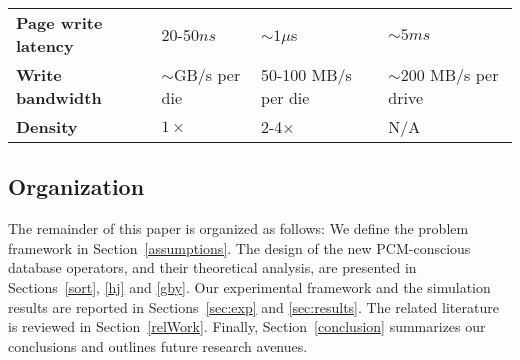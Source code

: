 \begin{table}[!h]
\begin{small}
\begin{tabular}{p{2.3cm}p{1.5cm}p{1.7cm}p{1.7cm}}
  \textbf{Page write latency} & 20-50$ns$ & $\sim 1 \mu$s  & $\sim5ms$ \\                                 
  
  \textbf{Write bandwidth}  & $\sim$GB/s per die & 50-100 MB/s per die  & $\sim$200 MB/s per drive \\ 
  
  \textbf{Density} & $1\times$ & 2-4$\times$ & N/A \\                                                     
  
  \bottomrule                                                                                             
  \end{tabular}                                                                                           
  \end{small}                                                                                             
  \end{table}                        

\subsection*{Organization}
The remainder of this paper is organized as follows: We define the problem
framework in Section~\ref{assumptions}. The design of the new PCM-conscious
database operators, and their theoretical analysis, are presented in
Sections~\ref{sort}, \ref{hj} and \ref{gby}.
Our experimental framework and the simulation results are reported
in Sections~\ref{sec:exp} and \ref{sec:results}.  The related literature is reviewed in
Section~\ref{relWork}.  Finally, Section~\ref{conclusion} summarizes
our conclusions and outlines future research avenues.

